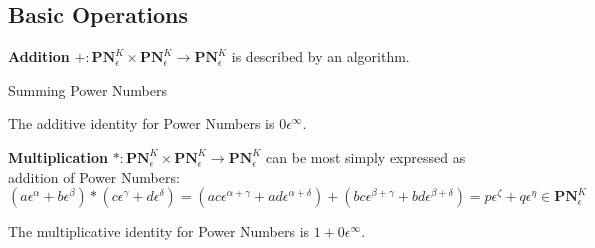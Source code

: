 \documentclass[acmsmall]{acmart}
\begin{document}
\subsection{Basic Operations}
\begin{definition}
\textbf{Addition} $+:\mathbf{PN}^K_\epsilon \times \mathbf{PN}^K_\epsilon \rightarrow \mathbf{PN}^K_\epsilon$ is described by an algorithm.

\begin{algorithm}[H]
	\SetAlgoLined
	
	\caption{Summing Power Numbers}	
\end{algorithm}

The additive identity for Power Numbers is $0\epsilon^\infty$.
\end{definition}

\begin{definition}
\textbf{Multiplication} $*:\mathbf{PN}^K_\epsilon \times \mathbf{PN}^K_\epsilon \rightarrow \mathbf{PN}^K_\epsilon$ can be most simply expressed as addition of Power Numbers:
\begin{displaymath}
(a\epsilon^\alpha + b\epsilon^\beta) * (c\epsilon^\gamma + d\epsilon^\delta)
= (ac\epsilon^{\alpha+\gamma} + ad\epsilon^{\alpha+\delta}) + (bc\epsilon^{\beta+\gamma}+ bd\epsilon^{\beta+\delta})
= p\epsilon^\zeta + q\epsilon^\eta \in \mathbf{PN}^K_\epsilon
\end{displaymath}

The multiplicative identity for Power Numbers is $1 + 0\epsilon^\infty$.
\end{definition}
	
\end{document}
